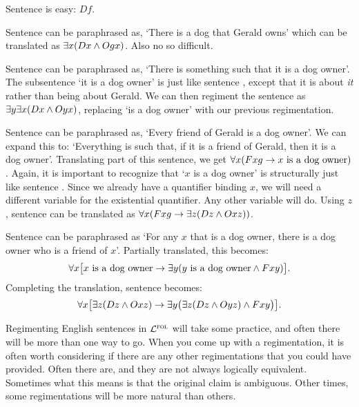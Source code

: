 Sentence  is easy: $Df$.

Sentence  can be paraphrased as, `There is a dog that Gerald owns' which can be translated as $\exists x(Dx \wedge Ogx)$.
Also no so difficult.

Sentence  can be paraphrased as, `There is something such that it is a dog owner'.
The subsentence `it is a dog owner' is just like sentence , except that it is about \textit{it} rather than being about Gerald.
We can then regiment the sentence  as $\exists y \exists x(Dx \wedge Oyx)$, replacing `is a dog owner' with our previous regimentation. 

Sentence  can be paraphrased as, `Every friend of Gerald is a dog owner'.
We can expand this to: `Everything is such that, if it is a friend of Gerald, then it is a dog owner'.
Translating part of this sentence, we get $\forall x(Fxg \rightarrow\mbox{$x$ is a dog owner})$.
Again, it is important to recognize that `$x$ is a dog owner' is structurally just like sentence .
Since we already have a quantifier binding $x$, we will need a different variable for the existential quantifier.
Any other variable will do.
Using $z$, sentence  can be translated as $\forall x(Fxg \rightarrow\exists z(Dz \wedge Oxz))$.

Sentence  can be paraphrased as `For any $x$ that is a dog owner, there is a dog owner who is a friend of $x$'.
Partially translated, this becomes: 
  $$\forall x\bigl[\mbox{$x$ is a dog owner}\rightarrow\exists y(\mbox{$y$ is a dog owner}\wedge Fxy)\bigr].$$
Completing the translation, sentence  becomes: 
  $$\forall x\bigl[\exists z(Dz \wedge Oxz)\rightarrow\exists y\bigl(\exists z(Dz \wedge Oyz)\wedge Fxy\bigr)\bigr].$$

Regimenting English sentences in $\mathcal{L}^{\textsc{fol}}$ will take some practice, and often there will be more than one way to go.
When you come up with a regimentation, it is often worth considering if there are any other regimentations that you could have provided.
Often there are, and they are not always logically equivalent.
Sometimes what this means is that the original claim is ambiguous.
Other times, some regimentations will be more natural than others.

